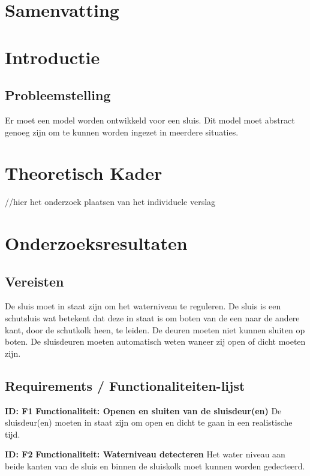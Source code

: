 \documentclass{article}
\begin{document}
\section{Samenvatting}
\section{Introductie}
\subsection{Probleemstelling}
Er moet een model worden ontwikkeld voor een sluis. Dit model moet abstract genoeg zijn om te kunnen worden ingezet in meerdere situaties.
\section{Theoretisch Kader}
//hier het onderzoek plaatsen van het individuele verslag
\section{Onderzoeksresultaten}

\subsection{Vereisten}

De sluis moet in staat zijn om het waterniveau te reguleren. De sluis is een schutsluis wat betekent dat deze in staat is om boten van de een naar de andere kant, door de schutkolk heen, te leiden. De deuren moeten niet kunnen sluiten op boten. De sluisdeuren moeten automatisch weten waneer zij open of dicht moeten zijn.


\subsection{Requirements / Functionaliteiten-lijst}
\textbf{ID: F1} \newline
\textbf{Functionaliteit: Openen en sluiten van de sluisdeur(en)} \newline
De sluisdeur(en) moeten in staat zijn om open en dicht te gaan in een realistische tijd. \newline

\textbf{ID: F2} \newline
\textbf{Functionaliteit: Waterniveau detecteren} \newline
Het water niveau aan beide kanten van de sluis en binnen de sluiskolk moet kunnen worden gedecteerd. \newline
\end{document}
